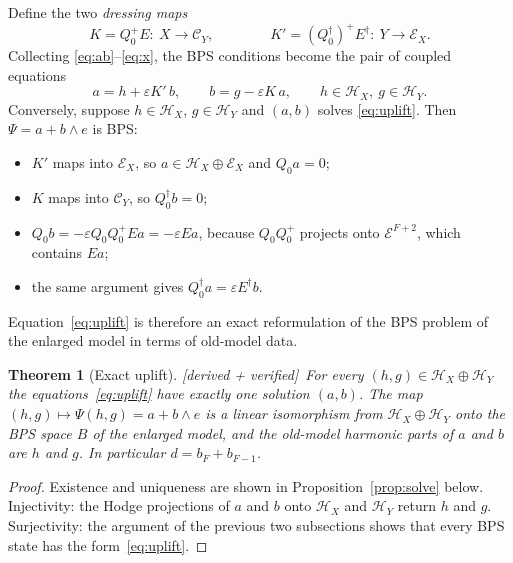 \documentclass[11pt]{article}
\newcommand{\eps}{\varepsilon}
\newcommand{\Hc}{\mathcal H}
\newcommand{\Ec}{\mathcal E}
\newcommand{\Cc}{\mathcal C}
\newcommand{\tagbox}[2]{\textsf{\small\color{#1}[#2]}}
\newcommand{\VER}{\tagbox{cder}{derived + verified}}
\theoremstyle{plain}
\newtheorem{theorem}{Theorem}
\theoremstyle{remark}
\numberwithin{equation}{section}
\begin{document}
Define the two \emph{dressing maps}
\begin{equation}\label{eq:K}
K=Q_0^+E:\ X\to\Cc_Y,\qquad\qquad K'=(Q_0^\dagger)^+E^\dagger:\ Y\to\Ec_X .
\end{equation}
Collecting \eqref{eq:ab}--\eqref{eq:x}, the BPS conditions become the pair of coupled equations
\begin{equation}\label{eq:uplift}
\boxed{\;a=h+\eps K'\,b,\qquad b=g-\eps K\,a,\qquad h\in\Hc_X,\ g\in\Hc_Y.\;}
\end{equation}
Conversely, suppose $h\in\Hc_X$, $g\in\Hc_Y$ and $(a,b)$ solves \eqref{eq:uplift}. Then $\Psi=a+b\wedge e$ is BPS:
\begin{itemize}\itemsep1pt
\item $K'$ maps into $\Ec_X$, so $a\in\Hc_X\oplus\Ec_X$ and $Q_0a=0$;
\item $K$ maps into $\Cc_Y$, so $Q_0^\dagger b=0$;
\item $Q_0b=-\eps Q_0Q_0^+Ea=-\eps Ea$, because $Q_0Q_0^+$ projects onto $\Ec^{F+2}$, which contains $Ea$;
\item the same argument gives $Q_0^\dagger a=\eps E^\dagger b$.
\end{itemize}
Equation~\eqref{eq:uplift} is therefore an exact reformulation of the BPS problem of the enlarged model in terms of old-model data.

\begin{theorem}[Exact uplift]\label{thm:uplift}\VER\
For every $(h,g)\in\Hc_X\oplus\Hc_Y$ the equations~\eqref{eq:uplift} have exactly one solution $(a,b)$. The map
$(h,g)\mapsto\Psi(h,g)=a+b\wedge e$ is a linear isomorphism from $\Hc_X\oplus\Hc_Y$ onto the BPS space $B$ of the enlarged
model, and the old-model harmonic parts of $a$ and $b$ are $h$ and $g$. In particular $d=b_F+b_{F-1}$.
\end{theorem}

\begin{proof}
Existence and uniqueness are shown in Proposition~\ref{prop:solve} below. Injectivity: the Hodge projections of $a$ and $b$
onto $\Hc_X$ and $\Hc_Y$ return $h$ and $g$. Surjectivity: the argument of the previous two subsections shows that every BPS
state has the form~\eqref{eq:uplift}.
\end{proof}
\end{document}
